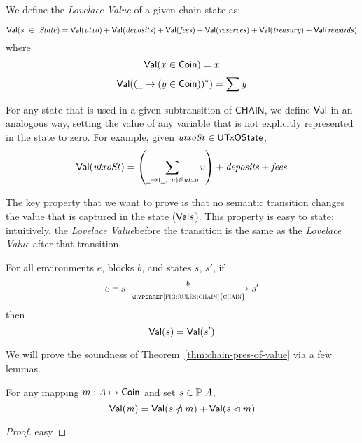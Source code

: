 We define the \emph{Lovelace Value} of a given chain state as:
\begin{definition}
  \label{def:val}
  \begin{equation*}
    \mathsf{Val}(s~\in~\mathit{State}) =
        \mathsf{Val}(\mathit{utxo}) +
            \mathsf{Val}(\mathit{deposits}) +
            \mathsf{Val}(\mathit{fees}) +
            \mathsf{Val}(\mathit{reserves}) +
            \mathsf{Val}(\mathit{treasury}) +
            \mathsf{Val}(\mathit{rewards})
  \end{equation*}
  where
  \begin{equation*}
      \mathsf{Val}(x \in \mathsf{Coin}) = x
  \end{equation*}
  \begin{equation*}
      \Val((\wcard\mapsto (y \in \Coin))^{*}) = \sum y
  \end{equation*}
\end{definition}

\noindent
For any state that is used in a given subtransition of $\mathsf{CHAIN}$,
we define $\mathsf{Val}{}$ in an analogous way, setting the value of any variable that is not explicitly
represented in the state to zero.
For example, given $\mathit{utxoSt}\in\mathsf{UTxOState}$,
\begin{equation*}
  \Val(\var{utxoSt}) =
  \left(\sum_{\wcard\mapsto(\wcard,~v)\in\var{utxo}}v\right) + \var{deposits} + \var{fees}
\end{equation*}

\noindent
The key property that we want to prove is that no semantic transition changes the value that
is captured in the state ($\mathsf{Val}{s}$).
This property is easy to state: intuitively,
the \emph{Lovelace Value}before the transition is the same as the
\emph{Lovelace Value} after that transition.

\begin{theorem}
  \label{thm:chain-pres-of-value}
  For all environments $e$, blocks $b$, and states $s$, $s'$, if
  \begin{equation*}
    e\vdash s\trans{\hyperref[fig:rules:chain]{chain}}{b}s'
  \end{equation*}
  then
  \begin{equation*}
    \mathsf{Val}(s) = \mathsf{Val}(s')
  \end{equation*}
\end{theorem}

\noindent
We will prove the soundness of Theorem~\ref{thm:chain-pres-of-value} via a few lemmas.

\begin{lemma}
  \label{lemma:value-sum-pres-1}
  For any mapping $m:A\mapsto\mathsf{Coin}$ and set $s\in\mathbb{P}~A$,
  \begin{equation*}
    \mathsf{Val}(\mathit{m}) = \mathsf{Val}(s\mathbin{\slashed{\lhd}} m) + \mathsf{Val}(s\lhd m)
  \end{equation*}
\end{lemma}
\begin{proof}
  easy
\end{proof}

